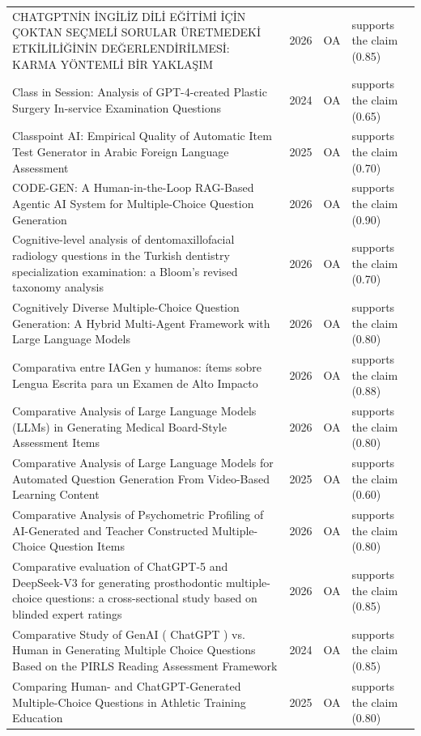 \begin{longtable}{@{}%
  >{\raggedright\arraybackslash}p{}c%
  >{\raggedright\arraybackslash}p{}%
  >{\raggedright\arraybackslash}p{}@{}}
CHATGPTNİN İNGİLİZ DİLİ EĞİTİMİ İÇİN ÇOKTAN SEÇMELİ SORULAR ÜRETMEDEKİ ETKİLİLİĞİNİN DEĞERLENDİRİLMESİ: KARMA YÖNTEMLİ BİR YAKLAŞIM & 2026 & OA & supports the claim (0.85) \\
Class in Session: Analysis of GPT-4-created Plastic Surgery In-service Examination Questions & 2024 & OA & supports the claim (0.65) \\
Classpoint AI: Empirical Quality of Automatic Item Test Generator in Arabic Foreign Language Assessment & 2025 & OA & supports the claim (0.70) \\
CODE-GEN: A Human-in-the-Loop RAG-Based Agentic AI System for Multiple-Choice Question Generation & 2026 & OA & supports the claim (0.90) \\
Cognitive-level analysis of dentomaxillofacial radiology questions in the Turkish dentistry specialization examination: a Bloom's revised taxonomy analysis & 2026 & OA & supports the claim (0.70) \\
Cognitively Diverse Multiple-Choice Question Generation: A Hybrid Multi-Agent Framework with Large Language Models & 2026 & OA & supports the claim (0.80) \\
Comparativa entre IAGen y humanos: ítems sobre Lengua Escrita para un Examen de Alto Impacto & 2026 & OA & supports the claim (0.88) \\
Comparative Analysis of Large Language Models (LLMs) in Generating Medical Board-Style Assessment Items & 2026 & OA & supports the claim (0.80) \\
Comparative Analysis of Large Language Models for Automated Question Generation From Video-Based Learning Content & 2025 & OA & supports the claim (0.60) \\
Comparative Analysis of Psychometric Profiling of AI-Generated and Teacher Constructed Multiple-Choice Question Items & 2026 & OA & supports the claim (0.80) \\
Comparative evaluation of ChatGPT-5 and DeepSeek-V3 for generating prosthodontic multiple-choice questions: a cross-sectional study based on blinded expert ratings & 2026 & OA & supports the claim (0.85) \\
Comparative Study of GenAI ( ChatGPT ) vs. Human in Generating Multiple Choice Questions Based on the PIRLS Reading Assessment Framework & 2024 & OA & supports the claim (0.85) \\
Comparing Human- and ChatGPT-Generated Multiple-Choice Questions in Athletic Training Education & 2025 & OA & supports the claim (0.80) \\

\end{longtable}

